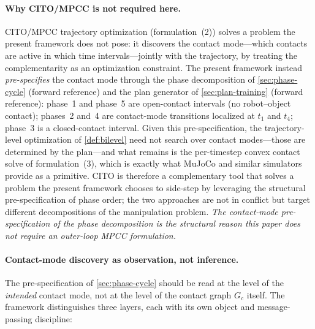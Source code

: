\paragraph{Why CITO/MPCC is not required here.}
CITO/MPCC trajectory optimization (formulation~(2)) solves a
problem the present framework does not pose: it discovers the
contact mode---which contacts are active in which time
intervals---jointly with the trajectory, by treating the
complementarity as an optimization constraint. The present
framework instead \emph{pre-specifies} the contact mode through
the phase decomposition of \cref{sec:phase-cycle} (forward
reference) and the plan generator of \cref{sec:plan-training}
(forward reference): phase~1 and phase~5 are open-contact
intervals (no robot--object contact); phases~2 and~4 are
contact-mode transitions localized at $t_{1}$ and $t_{4}$;
phase~3 is a closed-contact interval. Given this
pre-specification, the trajectory-level optimization of
\cref{def:bilevel} need not search over contact modes---those are
determined by the plan---and what remains is the per-timestep
convex contact solve of formulation~(3), which is exactly what
MuJoCo and similar simulators provide as a primitive. CITO is
therefore a complementary tool that solves a problem the present
framework chooses to side-step by leveraging the structural
pre-specification of phase order; the two approaches are not in
conflict but target different decompositions of the manipulation
problem. \emph{The contact-mode pre-specification of the phase
decomposition is the structural reason this paper does not
require an outer-loop MPCC formulation.}

\paragraph{Contact-mode discovery as observation, not inference.}
The pre-specification of \cref{sec:phase-cycle} should be read at
the level of the \emph{intended} contact mode, not at the level of
the contact graph $G_{c}$ itself. The framework distinguishes
three layers, each with its own object and message-passing
discipline:

